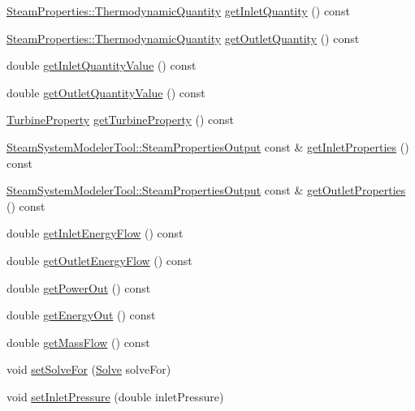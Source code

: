 \begin{DoxyCompactItemize}
\item 
\hyperlink{class_steam_properties_ae0294bedf7d178c2d8fb6aed0f62fbff}{Steam\+Properties\+::\+Thermodynamic\+Quantity} \hyperlink{class_turbine_ac9e91d9539cea5cd1e0037c397c28c78}{get\+Inlet\+Quantity} () const
\item 
\hyperlink{class_steam_properties_ae0294bedf7d178c2d8fb6aed0f62fbff}{Steam\+Properties\+::\+Thermodynamic\+Quantity} \hyperlink{class_turbine_acd3e98ab67754b652de97498d9bec6d2}{get\+Outlet\+Quantity} () const
\item 
double \hyperlink{class_turbine_a3d8a3f317fa71abb3404144371615725}{get\+Inlet\+Quantity\+Value} () const
\item 
double \hyperlink{class_turbine_aca98f128213e02e95dfd6f4b2ad8de4e}{get\+Outlet\+Quantity\+Value} () const
\item 
\hyperlink{class_turbine_a5db4f65cf2539e3837684d53221ade12}{Turbine\+Property} \hyperlink{class_turbine_a14f6eff49b501aa8c5a22d404dbeaac0}{get\+Turbine\+Property} () const
\item 
\hyperlink{struct_steam_system_modeler_tool_1_1_steam_properties_output}{Steam\+System\+Modeler\+Tool\+::\+Steam\+Properties\+Output} const  \& \hyperlink{class_turbine_a7a906cf74affed9acfa4045964eccbf6}{get\+Inlet\+Properties} () const
\item 
\hyperlink{struct_steam_system_modeler_tool_1_1_steam_properties_output}{Steam\+System\+Modeler\+Tool\+::\+Steam\+Properties\+Output} const  \& \hyperlink{class_turbine_aa9449622449e78285a258823ff77c8ec}{get\+Outlet\+Properties} () const
\item 
double \hyperlink{class_turbine_ae5d55a7b882e4780d490d43409f8f06c}{get\+Inlet\+Energy\+Flow} () const
\item 
double \hyperlink{class_turbine_aa20c0f9dd81cd9bfd5eda77f588516b5}{get\+Outlet\+Energy\+Flow} () const
\item 
double \hyperlink{class_turbine_a89585cc2fbfdbe67d539eae08c369fa2}{get\+Power\+Out} () const
\item 
double \hyperlink{class_turbine_a143fc660274e0d65ccb8fc55cc2caf83}{get\+Energy\+Out} () const
\item 
double \hyperlink{class_turbine_a4893a203dbbf9db9ca77a0b278c4c118}{get\+Mass\+Flow} () const
\item 
void \hyperlink{class_turbine_a96f54a8fc572dae6c5298289de890f4d}{set\+Solve\+For} (\hyperlink{class_turbine_a9fd7beba6c6f071e228fbe3e07969d2b}{Solve} solve\+For)
\item 
void \hyperlink{class_turbine_a04996baab9a40d449a69c737c00be8e4}{set\+Inlet\+Pressure} (double inlet\+Pressure)

\end{DoxyCompactItemize}
